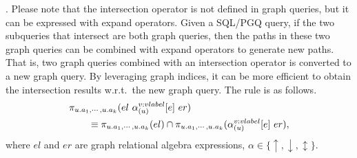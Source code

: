 \intersectrule. 
Please note that the intersection operator is not defined in graph queries, but it can be expressed with expand operators.
Given a SQL/PGQ query, if the two subqueries that intersect are both graph queries, then the paths in these two graph queries can be combined with expand operators to generate new paths.
That is, two graph queries combined with an intersection operator is converted to a new graph query.
By leveraging graph indices, it can be more efficient to obtain the intersection results w.r.t.~the new graph query.
The rule is as follows.
\begin{equation}
    \begin{split}
        & \pi_{u.a_1, \cdots, u.a_k}(el~\alpha_{(u)}^{v:vlabel}[e]~er) \\
        & \hspace*{2em} \equiv \pi_{u.a_1, \cdots, u.a_k}(el) \cap \pi_{u.a_1, \cdots, u.a_k}(\alpha_{(u)}^{v:vlabel}[e]~er),
    \end{split}
\end{equation}
where $el$ and $er$ are graph relational algebra expressions, $\alpha \in \{\uparrow, \downarrow, \updownarrow\}$.